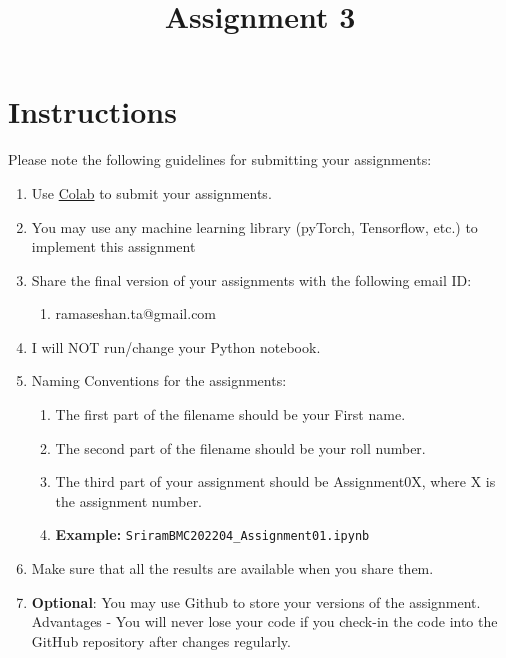     


    \title{Assignment 3}
    \date{}
    
        \section{Instructions}
        Please note the following guidelines for submitting your assignments:
        \begin{enumerate}
            \item Use \href{https://colab.research.google.com}{Colab}  to submit your assignments.
            \item You may use  any machine learning library (pyTorch, Tensorflow, etc.) to implement this assignment
            \item Share the final version of your assignments with the following email ID:
            \begin{enumerate}
                \item  ramaseshan.ta@gmail.com
            \end{enumerate}

            \item I will NOT run/change your Python notebook.
            \item Naming Conventions for the assignments:
            \begin{enumerate}
                \item The first part of the filename should be your First name.
                \item The second part of the filename should be your roll number.
                \item The third part of your assignment should be Assignment0X, where X is the assignment number.
                \item[] \textbf{Example:} \verb|SriramBMC202204_Assignment01.ipynb|
            \end{enumerate}
            \item Make sure that all the results are available when you share them.
            \item \textbf{Optional}: You may use Github to store your versions of the assignment. Advantages - You will never lose your code if you check-in the code into the GitHub repository after changes regularly.
        \end{enumerate}
        \pagebreak
